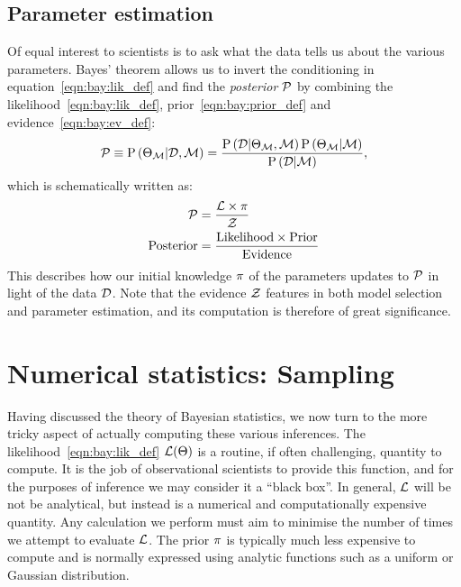 \subsection{Parameter estimation}
Of equal interest to scientists is to ask what the data tells us about the various parameters.  
Bayes' theorem allows us to invert the conditioning in equation~\eqref{eqn:bay:lik_def} and find the {\em posterior\/} $\mathcal{P}$ by combining the likelihood~\eqref{eqn:bay:lik_def}, prior~\eqref{eqn:bay:prior_def} and evidence~\eqref{eqn:bay:ev_def}:
%
\begin{equation}
  \mathcal{P}\equiv
  \mathrm{P}\left(\Theta_{\mathcal{M}}\middle|\mathcal{D},\mathcal{M}\right) = \frac{\mathrm{P}\left(\mathcal{D}\middle|\Theta_{\mathcal{M}},\mathcal{M}\right) \mathrm{P}\left(\Theta_{\mathcal{M}}\middle|\mathcal{M}\right)}{\mathrm{P}\left(\mathcal{D}\middle|\mathcal{M}\right)},
  \label{eqn:bay:bayes_theorem}
\end{equation}
%
which is schematically written as:
\begin{align}
  \mathcal{P} &= \frac{\mathcal{L} \times \pi }{\mathcal{Z} }
  \label{eqn:bay:bayes_theorem_abbrv}\\
  \mathrm{Posterior} &= \frac{\mathrm{Likelihood} \times \mathrm{Prior} }{\mathrm{Evidence} }
\end{align}
This describes how our initial knowledge $\pi$ of the parameters updates to $\mathcal{P}$ in light of the data $\mathcal{D}$. Note that the evidence $\mathcal{Z}$ features in both model selection and parameter estimation, and its computation is therefore of great significance.







\section{Numerical statistics: Sampling}
\label{sec:bay:samp}
Having discussed the theory of Bayesian statistics, we now turn to the more tricky aspect of actually computing these various inferences. The likelihood~\eqref{eqn:bay:lik_def} $\mathcal{L}(\Theta)$ is a routine, if often challenging, quantity to compute. It is the job of observational scientists to provide this function, and for the purposes of inference we may consider it a ``black box''. In general, $\mathcal{L}$ will be not be analytical, but instead is a numerical and computationally expensive quantity. Any calculation we perform must aim to minimise the number of times we attempt to evaluate $\mathcal{L}$. The prior $\pi$ is typically much less expensive to compute and is normally expressed using analytic functions such as a uniform or Gaussian distribution.

